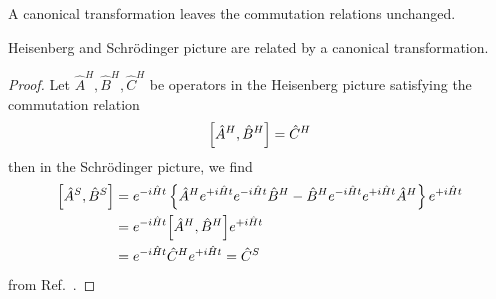 \begin{definition}
	A canonical transformation leaves the commutation relations unchanged.	
\end{definition}
\begin{lemma}\label{thm:heisenberg_schroedinger_canonical_transformation}
	Heisenberg and Schrödinger picture are related by a canonical transformation.
\end{lemma}
\begin{proof}
	Let $\hat{A}^H,\hat{B}^H,\hat{C}^H$ be operators in the Heisenberg picture satisfying the commutation relation
	\begin{equation*}
		\comm{\hat{A}^H}{\hat{B}^H}
		=
		\hat{C}^H
	\end{equation*}
	then in the Schrödinger picture, we find
	\begin{equation*}
		\begin{split}
			\comm{\hat{A}^S}{\hat{B}^S}
			&=
			e^{-i\hat{H}t}
			\left\{
				\hat{A}^H
				e^{+i\hat{H}t}
				e^{-i\hat{H}t}
				\hat{B}^H
				-	
				\hat{B}^H
				e^{-i\hat{H}t}
				e^{+i\hat{H}t}
				\hat{A}^H
			\right\}
			e^{+i\hat{H}t}
			\\
			&=
			e^{-i\hat{H}t}
			\comm{\hat{A}^H}{\hat{B}^H}
			e^{+i\hat{H}t}
			\\
			&=
			e^{-i\hat{H}t}
			\hat{C}^H
			e^{+i\hat{H}t}
			=
			\hat{C}^S
		\end{split}
	\end{equation*}
	from Ref.~\cite[p.~213]{Greiner2013}.
\end{proof}

